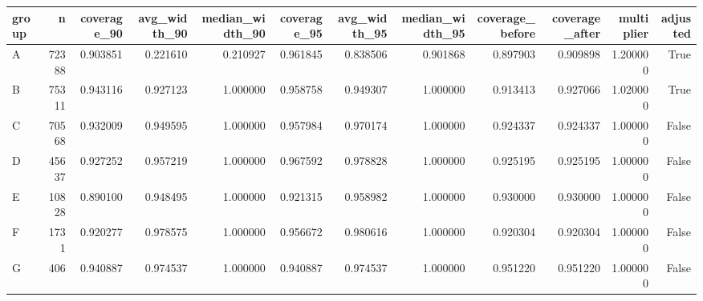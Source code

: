 \begin{tabular}{lrrrrrrrrrrr}
\toprule
group & n & coverage_90 & avg_width_90 & median_width_90 & coverage_95 & avg_width_95 & median_width_95 & coverage_before & coverage_after & multiplier & adjusted \\
\midrule
A & 72388 & 0.903851 & 0.221610 & 0.210927 & 0.961845 & 0.838506 & 0.901868 & 0.897903 & 0.909898 & 1.200000 & True \\
B & 75311 & 0.943116 & 0.927123 & 1.000000 & 0.958758 & 0.949307 & 1.000000 & 0.913413 & 0.927066 & 1.020000 & True \\
C & 70568 & 0.932009 & 0.949595 & 1.000000 & 0.957984 & 0.970174 & 1.000000 & 0.924337 & 0.924337 & 1.000000 & False \\
D & 45637 & 0.927252 & 0.957219 & 1.000000 & 0.967592 & 0.978828 & 1.000000 & 0.925195 & 0.925195 & 1.000000 & False \\
E & 10828 & 0.890100 & 0.948495 & 1.000000 & 0.921315 & 0.958982 & 1.000000 & 0.930000 & 0.930000 & 1.000000 & False \\
F & 1731 & 0.920277 & 0.978575 & 1.000000 & 0.956672 & 0.980616 & 1.000000 & 0.920304 & 0.920304 & 1.000000 & False \\
G & 406 & 0.940887 & 0.974537 & 1.000000 & 0.940887 & 0.974537 & 1.000000 & 0.951220 & 0.951220 & 1.000000 & False \\
\bottomrule
\end{tabular}
